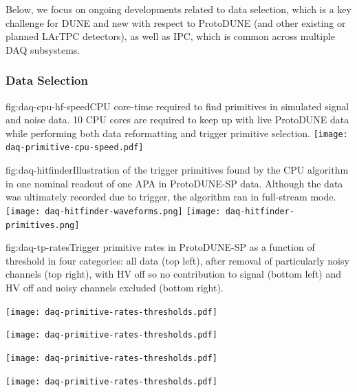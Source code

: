 Below, we focus on ongoing developments related to
data selection, which is a key challenge for DUNE and new with respect
to ProtoDUNE (and other existing or planned LArTPC detectors), as well
as IPC, which is common across multiple DAQ subsystems.

\subsubsection{Data Selection}

\begin{dunefigure}{fig:daq-cpu-hf-speed}{CPU core-time required to find primitives in simulated signal and noise data.  10 CPU cores are required to keep up with live ProtoDUNE data while performing both data reformatting and trigger primitive selection.}
  \texttt{[image: daq-primitive-cpu-speed.pdf]}
\end{dunefigure}

\begin{dunefigure}{fig:daq-hitfinder}{Illustration of the trigger primitives found by the CPU algorithm in one nominal readout of one APA in ProtoDUNE-SP data.  Although the data was ultimately recorded due to trigger, the algorithm ran in full-stream mode.}
    \texttt{[image: daq-hitfinder-waveforms.png]}%
    \texttt{[image: daq-hitfinder-primitives.png]}
\end{dunefigure}

\begin{dunefigure}{fig:daq-tp-rates}{Trigger primitive rates in ProtoDUNE-SP as a function of threshold in four categories: all data (top left),  after removal of particularly noisy channels (top right), with HV off so no contribution to signal (bottom left) and HV off and noisy channels excluded (bottom right).}
  \begin{minipage}[b]{0.5\linewidth}
    \begin{center}
      \texttt{[image: daq-primitive-rates-thresholds.pdf]}

      \texttt{[image: daq-primitive-rates-thresholds.pdf]}
    \end{center}
  \end{minipage}%
  \begin{minipage}[b]{0.5\linewidth}
    \begin{center}
      \texttt{[image: daq-primitive-rates-thresholds.pdf]}

      \texttt{[image: daq-primitive-rates-thresholds.pdf]}
    \end{center}
  \end{minipage}

\end{dunefigure}


